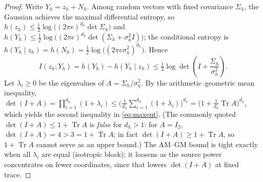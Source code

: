 \documentclass{ieeetj}
\theoremstyle{plain}
\theoremstyle{definition}
\begin{document}
\begin{proof}
Write $Y_h=z_h+N_h$. Among random vectors with fixed covariance $\Sigma_h$, the
Gaussian achieves the maximal differential entropy, so
$h(z_h)\le\tfrac12\log\big((2\pi e)^{d_h}\det\Sigma_h\big)$ and
$h(Y_h)\le\tfrac12\log\big((2\pi e)^{d_h}\det(\Sigma_h+\sigma_h^{2}I)\big)$;
the conditional entropy is
$h(Y_h\mid z_h)=h(N_h)=\tfrac12\log\big((2\pi e\sigma_h^{2})^{d_h}\big)$. Hence
\begin{equation*}
I(z_h;Y_h)=h(Y_h)-h(Y_h\mid z_h)
\le \tfrac12\log\det\!\left(I+\frac{\Sigma_h}{\sigma_h^{2}}\right).
\end{equation*}
Let $\lambda_i\ge0$ be the eigenvalues of $A=\Sigma_h/\sigma_h^{2}$. By the
arithmetic--geometric mean inequality,
$\det(I+A)=\prod_{i=1}^{d_h}(1+\lambda_i)
\le\big(\tfrac{1}{d_h}\sum_{i=1}^{d_h}(1+\lambda_i)\big)^{d_h}
=\big(1+\tfrac{1}{d_h}\operatorname{Tr}A\big)^{d_h}$, which yields the second
inequality in \eqref{eq:maxent}. (The commonly quoted $\det(I+A)\le1+\operatorname{Tr}A$
is \emph{false} for $d_h>1$: for $A=I_2$, $\det(I+A)=4>3=1+\operatorname{Tr}A$;
in fact $\det(I+A)\ge1+\operatorname{Tr}A$, so $1+\operatorname{Tr}A$ cannot serve
as an upper bound.) The AM--GM bound is tight exactly when all $\lambda_i$ are
equal (isotropic block); it loosens as the source power concentrates on fewer
coordinates, since that lowers $\det(I+A)$ at fixed trace.
\end{proof}
\end{document}
